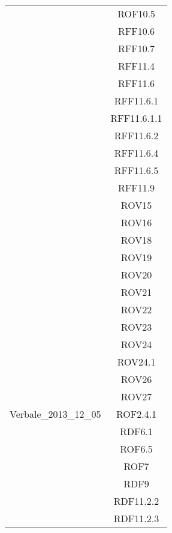 \begin{longtable}{|c|c|}
& ROF10.5\\
& RFF10.6\\
& RFF10.7\\
& RFF11.4\\
& RFF11.6\\
& RFF11.6.1\\
& RFF11.6.1.1\\
& RFF11.6.2\\
& RFF11.6.4\\
& RFF11.6.5\\
& RFF11.9\\
& ROV15\\
& ROV16\\
& ROV18\\
& ROV19\\
& ROV20\\
& ROV21\\
& ROV22\\
& ROV23\\
& ROV24\\
& ROV24.1\\
& ROV26\\
& ROV27\\


\midrule
Verbale\_2013\_12\_05
& ROF2.4.1\\
& RDF6.1\\
& ROF6.5\\
& ROF7\\
& RDF9\\
& RDF11.2.2\\
& RDF11.2.3\\


\end{longtable}
